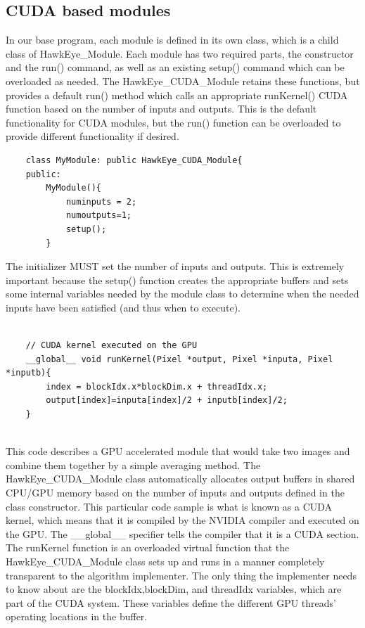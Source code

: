 \documentclass[letterpaper,10pt,titlepage]{IEEEtran}
\begin{document}
   \subsection{CUDA based modules}
In our base program, each module is defined in its own class, which is a child class of HawkEye\_Module. Each module has two required parts, the constructor and the run() command, as well as an existing setup() command which can be overloaded as needed. The HawkEye\_CUDA\_Module retains these functions, but provides a default run() method which calls an appropriate runKernel() CUDA function based on the number of inputs and outputs. This is the default functionality for CUDA modules, but the run() function can be overloaded to provide different functionality if desired. \\
   \begin{lstlisting}
   	class MyModule: public HawkEye_CUDA_Module{
	public:
		MyModule(){
			numinputs = 2;
			numoutputs=1;
			setup();
		}  
   \end{lstlisting}
 \par
   The initializer MUST set the number of inputs and outputs. This is extremely important because the setup() function creates the appropriate buffers and sets some internal variables needed by the module class to determine when the needed inputs have been satisfied (and thus when to execute).\\
   \begin{lstlisting}
	   
	// CUDA kernel executed on the GPU
   	__global__ void runKernel(Pixel *output, Pixel *inputa, Pixel *inputb){
	    index = blockIdx.x*blockDim.x + threadIdx.x;
		output[index]=inputa[index]/2 + inputb[index]/2;
	}
	
   \end{lstlisting}
 \par
   This code describes a GPU accelerated module that would take two images and combine them together by a simple averaging method. The HawkEye\_CUDA\_Module class automatically allocates output buffers in shared CPU/GPU memory based on the number of inputs and outputs defined in the class constructor. This particular code sample is what is known as a CUDA kernel, which means that it is compiled by the NVIDIA compiler and executed on the GPU. The \_\_global\_\_ specifier tells the compiler that it is a CUDA section. The runKernel function is an overloaded virtual function that the HawkEye\_CUDA\_Module class sets up and runs in a manner completely transparent to the algorithm implementer. The only thing the implementer needs to know about are the blockIdx,blockDim, and threadIdx variables, which are part of the CUDA system. These variables define the different GPU threads' operating locations in the buffer.\\
\end{document}
